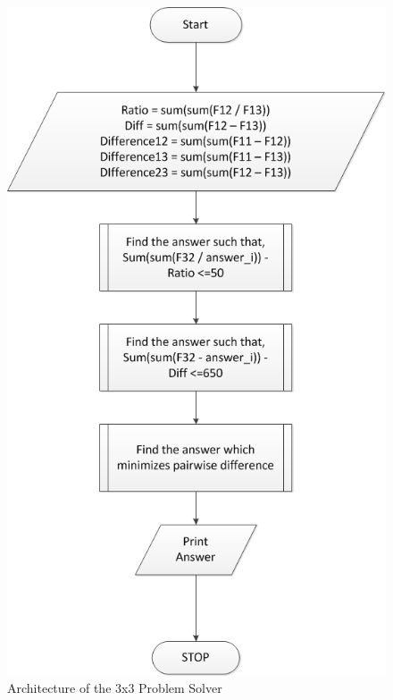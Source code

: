 \documentclass[10pt, letter]{article}
\begin{document}
\begin{figure}[h!]
  \centering
    \includegraphics[scale = 0.35]{Images/Fig8}
    \caption{Architecture of the 3x3 Problem Solver}
  \label{fig8}
\end{figure}
\end{document}
